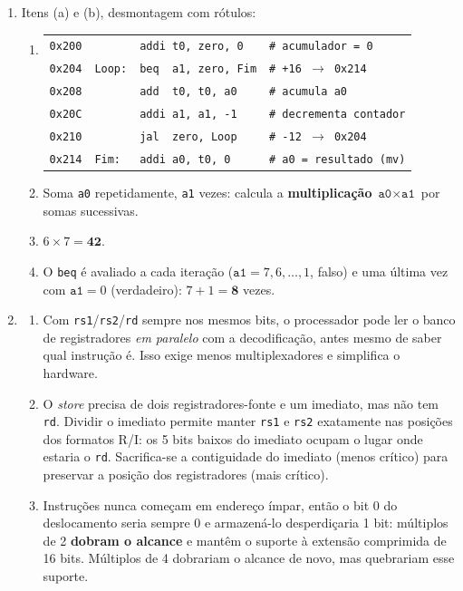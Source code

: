 \documentclass[11pt, a4paper]{article}
\begin{document}
\begin{enumerate}
\item Itens (a) e (b), desmontagem com r\'{o}tulos:
\begin{enumerate}
  \item[]
\begin{center}
\small
\begin{tabular}{llll}
\texttt{0x200} & & \texttt{addi t0, zero, 0} & \texttt{\# acumulador = 0}\\
\texttt{0x204} & \texttt{Loop:} & \texttt{beq \ a1, zero, Fim} & \texttt{\# +16 $\rightarrow$ 0x214}\\
\texttt{0x208} & & \texttt{add \ t0, t0, a0} & \texttt{\# acumula a0}\\
\texttt{0x20C} & & \texttt{addi a1, a1, -1} & \texttt{\# decrementa contador}\\
\texttt{0x210} & & \texttt{jal \ zero, Loop} & \texttt{\# -12 $\rightarrow$ 0x204}\\
\texttt{0x214} & \texttt{Fim:} & \texttt{addi a0, t0, 0} & \texttt{\# a0 = resultado (mv)}\\
\end{tabular}
\end{center}
  \item[c)] Soma \texttt{a0} repetidamente, \texttt{a1} vezes: calcula a \textbf{multiplica\c{c}\~{a}o} $\texttt{a0} \times \texttt{a1}$ por somas sucessivas.
  \item[d)] $6 \times 7 = \textbf{42}$.
  \item[e)] O \texttt{beq} \'{e} avaliado a cada itera\c{c}\~{a}o ($\texttt{a1} = 7, 6, \ldots, 1$, falso) e uma \'{u}ltima vez com $\texttt{a1} = 0$ (verdadeiro): $7 + 1 = \textbf{8}$ vezes.
\end{enumerate}

\item \begin{enumerate}
  \item Com \texttt{rs1}/\texttt{rs2}/\texttt{rd} sempre nos mesmos bits, o processador pode ler o banco de registradores \emph{em paralelo} com a decodifica\c{c}\~{a}o, antes mesmo de saber qual instru\c{c}\~{a}o \'{e}. Isso exige menos multiplexadores e simplifica o hardware.
  \item O \emph{store} precisa de dois registradores-fonte e um imediato, mas n\~{a}o tem \texttt{rd}. Dividir o imediato permite manter \texttt{rs1} e \texttt{rs2} exatamente nas posi\c{c}\~{o}es dos formatos R/I: os 5 bits baixos do imediato ocupam o lugar onde estaria o \texttt{rd}. Sacrifica-se a contiguidade do imediato (menos cr\'{i}tico) para preservar a posi\c{c}\~{a}o dos registradores (mais cr\'{i}tico).
  \item Instru\c{c}\~{o}es nunca come\c{c}am em endere\c{c}o \'{i}mpar, ent\~{a}o o bit 0 do deslocamento seria sempre 0 e armazen\'{a}-lo desperdi\c{c}aria 1 bit: m\'{u}ltiplos de 2 \textbf{dobram o alcance} e mant\^{e}m o suporte \`{a} extens\~{a}o comprimida de 16 bits. M\'{u}ltiplos de 4 dobrariam o alcance de novo, mas quebrariam esse suporte.
\end{enumerate}

\end{enumerate}
\end{document}
